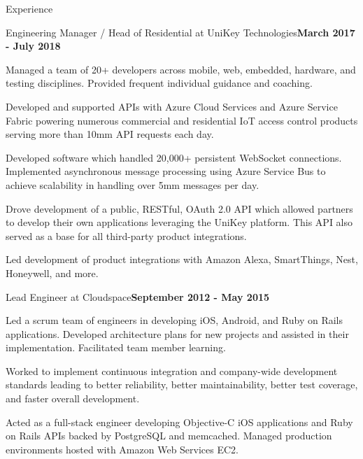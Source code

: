 \documentclass{resume} %
\begin{document}
\begin{rSection}{Experience}


\begin{rSubsection}{Engineering Manager / Head of Residential at UniKey Technologies}{\bf March 2017 - July 2018}{}{}

\item Managed a team of 20+ developers across mobile, web, embedded, hardware, and testing disciplines.  Provided frequent individual guidance and coaching.
\item Developed and supported APIs with Azure Cloud Services and Azure Service Fabric powering numerous commercial and residential IoT access control products serving more than 10mm API requests each day.
\item Developed software which handled 20,000+ persistent WebSocket connections. Implemented asynchronous message processing using Azure Service Bus to achieve scalability in handling over 5mm messages per day.
\item Drove development of a public, RESTful, OAuth 2.0 API which allowed partners to develop their own applications leveraging the UniKey platform.  This API also served as a base for all third-party product integrations.
\item Led development of product integrations with Amazon Alexa, SmartThings, Nest, Honeywell, and more.

\end{rSubsection}


\begin{rSubsection}{Lead Engineer at Cloudspace}{\bf September 2012 - May 2015}{}{}

\item Led a scrum team of engineers in developing iOS, Android, and Ruby on Rails applications.  Developed architecture plans for new projects and assisted in their implementation. Facilitated team member learning.
\item Worked to implement continuous integration and company-wide development standards leading to better reliability, better maintainability, better test coverage, and faster overall development.
\item Acted as a full-stack engineer developing Objective-C iOS applications and Ruby on Rails APIs backed by PostgreSQL and memcached. Managed production environments hosted with Amazon Web Services EC2.


\end{rSubsection}
\end{rSection}
\end{document}
